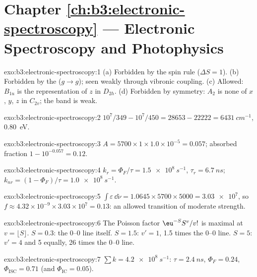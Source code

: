 \section*{Chapter \ref{ch:b3:electronic-spectroscopy} --- Electronic Spectroscopy and Photophysics}

\begin{solution}{exo:b3:electronic-spectroscopy:1}
(a) Forbidden by the spin rule ($\Delta S = 1$). (b) Forbidden by the 
($g \to g$); seen weakly through vibronic coupling. (c) Allowed: $B_{1u}$ is the
representation of $z$ in $D_{2h}$. (d) Forbidden by symmetry: $A_2$ is none of $x$,
$y$, $z$ in $C_{2v}$; the band is weak.
\end{solution}

\begin{solution}{exo:b3:electronic-spectroscopy:2}
$10^7/349 - 10^7/450 = 28653 - 22222 = \qty{6431}{cm^{-1}}$, \qty{0.80}{eV}.
\end{solution}

\begin{solution}{exo:b3:electronic-spectroscopy:3}
$A = 5700 \times 1 \times 1.0\times10^{-5} = 0.057$; absorbed fraction $1 - 10^{-0.057} =
0.12$.
\end{solution}

\begin{solution}{exo:b3:electronic-spectroscopy:4}
$k_r = \Phi_F/\tau = \qty{1.5e8}{s^{-1}}$, $\tau_r = \qty{6.7}{ns}$; $k_{nr} = (1 - \Phi_F)/\tau
= \qty{1.0e8}{s^{-1}}$.
\end{solution}

\begin{solution}{exo:b3:electronic-spectroscopy:5}
$\int\varepsilon\,\dd\tilde\nu = 1.0645 \times 5700 \times 5000 = \num{3.03e7}$, so $f \approx
4.32\times10^{-9} \times 3.03\times10^7 = 0.13$: an allowed transition of moderate
strength.
\end{solution}

\begin{solution}{exo:b3:electronic-spectroscopy:6}
The Poisson factor $\eu^{-S}S^v/v!$ is maximal at $v = \lfloor S\rfloor$. $S = 0.3$: the
0--0 line itself. $S = 1.5$: $v' = 1$, 1.5 times the 0--0 line. $S = 5$: $v' = 4$
and 5 equally, 26 times the 0--0 line.
\end{solution}

\begin{solution}{exo:b3:electronic-spectroscopy:7}
$\sum k = \qty{4.2e8}{s^{-1}}$: $\tau = \qty{2.4}{ns}$, $\Phi_F = 0.24$, $\Phi_{\mathrm{ISC}} = 0.71$
(and $\Phi_{\mathrm{IC}} = 0.05$).
\end{solution}

